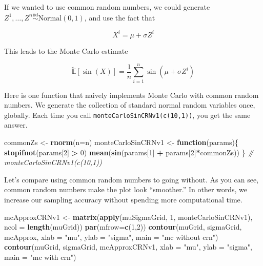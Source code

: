 \documentclass[12pt,krantz2]{krantz}
\makeatletter
\newenvironment{Shaded}{\begin{snugshade}}{\end{snugshade}}
\newcommand{\CommentTok}[1]{\textcolor[rgb]{0.37,0.37,0.37}{\textit{#1}}}
\newcommand{\ControlFlowTok}[1]{\textcolor[rgb]{0.27,0.27,0.27}{\textbf{#1}}}
\newcommand{\DataTypeTok}[1]{\textcolor[rgb]{0.27,0.27,0.27}{#1}}
\newcommand{\DecValTok}[1]{\textcolor[rgb]{0.06,0.06,0.06}{#1}}
\newcommand{\KeywordTok}[1]{\textcolor[rgb]{0.27,0.27,0.27}{\textbf{#1}}}
\newcommand{\NormalTok}[1]{#1}
\newcommand{\OperatorTok}[1]{\textcolor[rgb]{0.43,0.43,0.43}{\textbf{#1}}}
\newcommand{\StringTok}[1]{\textcolor[rgb]{0.5,0.5,0.5}{#1}}
\newenvironment{kframe}{%
\medskip{}
\setlength{\fboxsep}{.8em}
 \def\at@end@of@kframe{}%
 \ifinner\ifhmode%
  \def\at@end@of@kframe{\end{minipage}}%
  \begin{minipage}{\columnwidth}%
 \fi\fi%
 \def\FrameCommand##1{\hskip\@totalleftmargin \hskip-\fboxsep
 \colorbox{shadecolor}{##1}\hskip-\fboxsep
     \hskip-\linewidth \hskip-\@totalleftmargin \hskip\columnwidth}%
 \MakeFramed {\advance\hsize-\width
   \@totalleftmargin\z@ \linewidth\hsize
   \@setminipage}}%
 {\par\unskip\endMakeFramed%
 \at@end@of@kframe}
\renewenvironment{Shaded}{\begin{kframe}}{\end{kframe}}
\makeatother
\begin{document}
If we wanted to use common random numbers, we could generate \(Z^1, \ldots, Z^n \overset{\text{iid}}{\sim} \text{Normal}(0, 1)\), and use the fact that

\begin{equation} 
X^i = \mu + \sigma Z^i
\end{equation}

This leads to the Monte Carlo estimate

\begin{equation} 
\tilde{\mathbb{E}}[\sin(X)] = \frac{1}{n}\sum_{i=1}^n\sin(\mu + \sigma Z^i)
\end{equation}

Here is one function that naively implements Monte Carlo with common random numbers. We generate the collection of standard normal random variables once, globally. Each time you call \texttt{monteCarloSinCRNv1(c(10,1))}, you get the same answer.

\begin{Shaded}
\begin{Highlighting}[]
\NormalTok{commonZs <-}\StringTok{ }\KeywordTok{rnorm}\NormalTok{(}\DataTypeTok{n=}\NormalTok{n)}
\NormalTok{monteCarloSinCRNv1 <-}\StringTok{ }\ControlFlowTok{function}\NormalTok{(params)\{}
  \KeywordTok{stopifnot}\NormalTok{(params[}\DecValTok{2}\NormalTok{] }\OperatorTok{>}\StringTok{ }\DecValTok{0}\NormalTok{) }
  \KeywordTok{mean}\NormalTok{(}\KeywordTok{sin}\NormalTok{(params[}\DecValTok{1}\NormalTok{] }\OperatorTok{+}\StringTok{ }\NormalTok{params[}\DecValTok{2}\NormalTok{]}\OperatorTok{*}\NormalTok{commonZs))}
\NormalTok{\} }
\CommentTok{# monteCarloSinCRNv1(c(10,1))}
\end{Highlighting}
\end{Shaded}

Let's compare using common random numbers to going without. As you can see, common random numbers make the plot look ``smoother.'' In other words, we increase our sampling accuracy without spending more computational time.

\begin{Shaded}
\begin{Highlighting}[]
\NormalTok{mcApproxCRNv1 <-}\StringTok{ }\KeywordTok{matrix}\NormalTok{(}\KeywordTok{apply}\NormalTok{(muSigmaGrid, }\DecValTok{1}\NormalTok{, monteCarloSinCRNv1), }
                        \DataTypeTok{ncol =} \KeywordTok{length}\NormalTok{(muGrid))}
\KeywordTok{par}\NormalTok{(}\DataTypeTok{mfrow=}\KeywordTok{c}\NormalTok{(}\DecValTok{1}\NormalTok{,}\DecValTok{2}\NormalTok{))}
\KeywordTok{contour}\NormalTok{(muGrid, sigmaGrid, mcApprox, }
        \DataTypeTok{xlab =} \StringTok{"mu"}\NormalTok{, }\DataTypeTok{ylab =} \StringTok{"sigma"}\NormalTok{, }\DataTypeTok{main =} \StringTok{"mc without crn"}\NormalTok{)}
\KeywordTok{contour}\NormalTok{(muGrid, sigmaGrid, mcApproxCRNv1, }
        \DataTypeTok{xlab =} \StringTok{"mu"}\NormalTok{, }\DataTypeTok{ylab =} \StringTok{"sigma"}\NormalTok{, }\DataTypeTok{main =} \StringTok{"mc with crn"}\NormalTok{)}
\end{Highlighting}
\end{Shaded}
\end{document}
